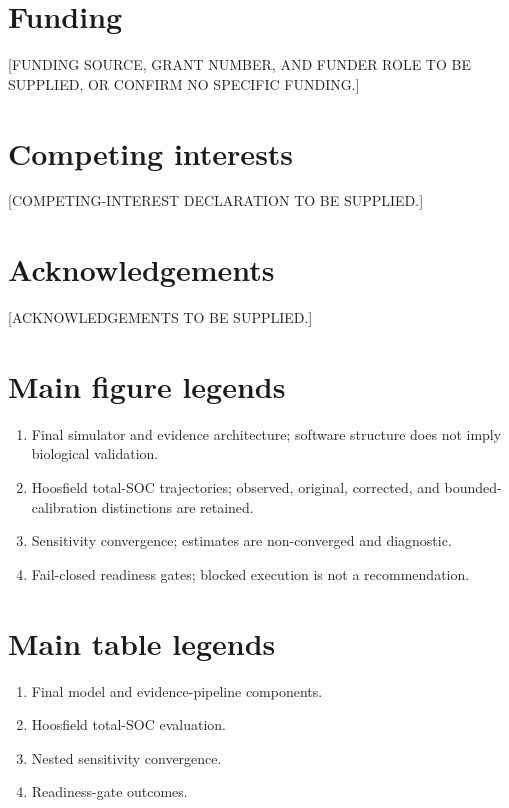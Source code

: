 \documentclass[11pt]{article}
\begin{document}
\section{Funding}
[FUNDING SOURCE, GRANT NUMBER, AND FUNDER ROLE TO BE SUPPLIED, OR CONFIRM NO SPECIFIC FUNDING.]

\section{Competing interests}
[COMPETING-INTEREST DECLARATION TO BE SUPPLIED.]

\section{Acknowledgements}
[ACKNOWLEDGEMENTS TO BE SUPPLIED.]




\section{Main figure legends}
\begin{enumerate}[label=\textbf{Figure \arabic*.}]
\item Final simulator and evidence architecture; software structure does not imply biological validation.
\item Hoosfield total-SOC trajectories; observed, original, corrected, and bounded-calibration distinctions are retained.
\item Sensitivity convergence; estimates are non-converged and diagnostic.
\item Fail-closed readiness gates; blocked execution is not a recommendation.
\end{enumerate}

\section{Main table legends}
\begin{enumerate}[label=\textbf{Table \arabic*.}]
\item Final model and evidence-pipeline components.
\item Hoosfield total-SOC evaluation.
\item Nested sensitivity convergence.
\item Readiness-gate outcomes.
\end{enumerate}

\clearpage
\appendix
\end{document}
